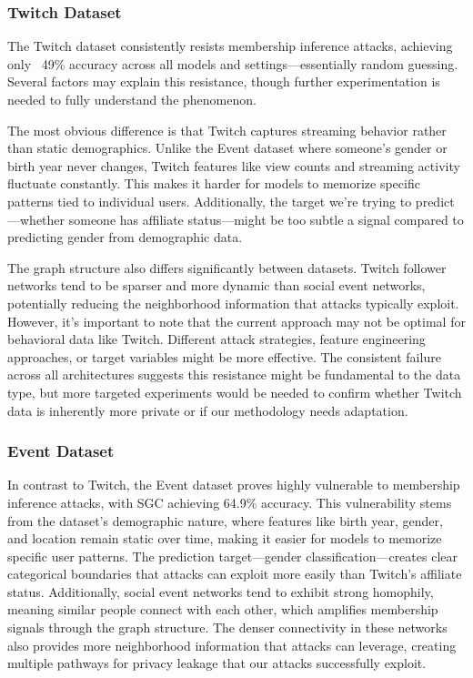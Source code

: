 \documentclass{article}
\begin{document}
\subsubsection{Twitch Dataset}
The Twitch dataset consistently resists membership inference attacks, achieving only ~49\% accuracy across all models and settings—essentially random guessing. Several factors may explain this resistance, though further experimentation is needed to fully understand the phenomenon.

The most obvious difference is that Twitch captures streaming behavior rather than static demographics. Unlike the Event dataset where someone's gender or birth year never changes, Twitch features like view counts and streaming activity fluctuate constantly. This makes it harder for models to memorize specific patterns tied to individual users. Additionally, the target we're trying to predict—whether someone has affiliate status—might be too subtle a signal compared to predicting gender from demographic data.

The graph structure also differs significantly between datasets. Twitch follower networks tend to be sparser and more dynamic than social event networks, potentially reducing the neighborhood information that attacks typically exploit. However, it's important to note that the current approach may not be optimal for behavioral data like Twitch. Different attack strategies, feature engineering approaches, or target variables might be more effective. The consistent failure across all architectures suggests this resistance might be fundamental to the data type, but more targeted experiments would be needed to confirm whether Twitch data is inherently more private or if our methodology needs adaptation.

\subsubsection{Event Dataset}
In contrast to Twitch, the Event dataset proves highly vulnerable to membership inference attacks, with SGC achieving 64.9\% accuracy. This vulnerability stems from the dataset's demographic nature, where features like birth year, gender, and location remain static over time, making it easier for models to memorize specific user patterns. The prediction target—gender classification—creates clear categorical boundaries that attacks can exploit more easily than Twitch's affiliate status. Additionally, social event networks tend to exhibit strong homophily, meaning similar people connect with each other, which amplifies membership signals through the graph structure. The denser connectivity in these networks also provides more neighborhood information that attacks can leverage, creating multiple pathways for privacy leakage that our attacks successfully exploit.
\end{document}

